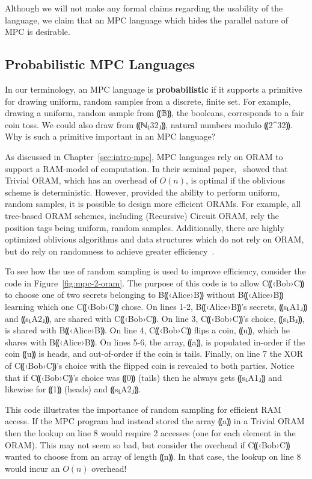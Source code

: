 \documentclass{report}
\newcommand{\alice}{B⸨‹Alice›B⸩\xspace}
\newcommand{\bob}{C⸨‹Bob›C⸩\xspace}
\begin{document}
Although we will not make any formal claims regarding the usability of the language, we claim that an MPC language which hides the parallel
nature of MPC is desirable.

\subsection{Probabilistic MPC Languages}
\label{subsec:background-properties-probabilistic}

In our terminology, an MPC language is \textbf{probabilistic} if it supports a primitive for drawing uniform, random samples from a
discrete, finite set. For example, drawing a uniform, random sample from ⸨𝔹⸩, the booleans, corresponds to a fair coin toss. We
could also draw from ⸨ℕ⸤32⸥⸩, natural numbers modulo ⸨2^{32}⸩. Why is such a primitive important in an MPC language?

As discussed in Chapter~\ref{sec:intro-mpc}, MPC languages rely on ORAM to support a RAM-model of computation. In their seminal paper,~\citet{}
showed that Trivial ORAM, which has an overhead of $O(n)$, is optimal if the oblivious scheme is deterministic. However, provided the ability
to perform uniform, random samples, it is possible to design more efficient ORAMs. For example, all tree-based ORAM schemes, including
(Recursive) Circuit ORAM, rely the position tags being uniform, random samples. Additionally, there are highly
optimized oblivious algorithms and data structures which do not rely on ORAM, but do rely on randomness to achieve greater efficiency~\cite{}.

To see how the use of random sampling is used to improve efficiency, consider the code in Figure~\ref{fig:mpc-2-oram}. The purpose of
this code is to allow \bob to choose one of two secrets belonging to \alice without \alice learning which one \bob chose. On lines 1-2,
\alice's secrets, ⸨s⸤A1⸥⸩ and ⸨s⸤A2⸥⸩, are shared with \bob. On line 3, \bob's choice, ⸨s⸤B⸥⸩, is shared with \alice.
On line 4, \bob flips a coin, ⸨u⸩, which he shares with \alice. On lines 5-6, the array, ⸨a⸩, is populated
in-order if the coin ⸨u⸩ is heads, and out-of-order if the coin is tails. Finally, on line 7 the XOR of \bob's choice with the flipped
coin is revealed to both parties. Notice that if \bob's choice was ⸨0⸩ (tails) then he always gets ⸨s⸤A1⸥⸩ and
likewise for ⸨1⸩ (heads) and ⸨s⸤A2⸥⸩.

This code illustrates the importance of random sampling for efficient RAM access. If the MPC program had instead stored the array ⸨a⸩ in
a Trivial ORAM then the lookup on line 8 would require 2 accesses (one for each element in the ORAM). This may not seem so bad, but consider
the overhead if \bob wanted to choose from an array of length ⸨n⸩. In that case, the lookup on line 8 would incur an $O(n)$ overhead!
\end{document}
